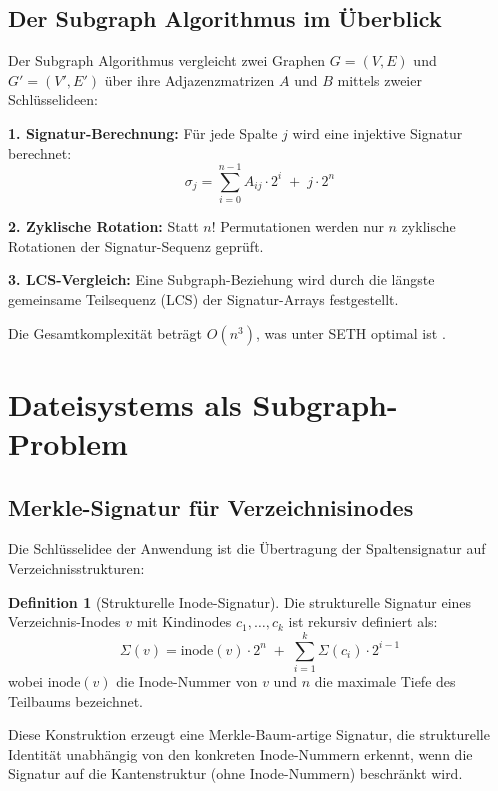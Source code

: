 ﻿\documentclass[a4paper,12pt]{article}
\theoremstyle{definition}
\newtheorem{definition}{Definition}
\begin{document}
\subsection{Der Subgraph Algorithmus im \"Uberblick}

Der Subgraph Algorithmus \cite{epp2026subgraph} vergleicht zwei Graphen
$G = (V, E)$ und $G' = (V', E')$ \"uber ihre Adjazenzmatrizen $A$ und $B$
mittels zweier Schl\"usselideen:

\textbf{1. Signatur-Berechnung:} F\"ur jede Spalte $j$ wird eine injektive
Signatur berechnet:
\[
    \sigma_j = \sum_{i=0}^{n-1} A_{ij} \cdot 2^i \;+\; j \cdot 2^n
\]

\textbf{2. Zyklische Rotation:} Statt $n!$ Permutationen werden nur $n$
zyklische Rotationen der Signatur-Sequenz gepr\"uft.

\textbf{3. LCS-Vergleich:} Eine Subgraph-Beziehung wird durch die l\"angste
gemeinsame Teilsequenz (LCS) der Signatur-Arrays festgestellt.

Die Gesamtkomplexit\"at betr\"agt $O(n^3)$, was unter SETH optimal ist
\cite{epp2026subgraph}.

\section{Dateisystems als Subgraph-Problem}

\subsection{Merkle-Signatur f\"ur Verzeichnisinodes}

Die Schlüsselidee der Anwendung ist die \"Ubertragung der Spaltensignatur auf
Verzeichnisstrukturen:

\begin{definition}[Strukturelle Inode-Signatur]
    Die strukturelle Signatur eines Verzeichnis-Inodes $v$ mit
    Kindinodes $c_1, \ldots, c_k$ ist rekursiv definiert als:
    \[
        \Sigma(v) = \text{inode}(v) \cdot 2^n \;+\;
        \sum_{i=1}^{k} \Sigma(c_i) \cdot 2^{i-1}
    \]
    wobei $\text{inode}(v)$ die Inode-Nummer von $v$ und $n$ die maximale
    Tiefe des Teilbaums bezeichnet.
\end{definition}

Diese Konstruktion erzeugt eine Merkle-Baum-artige Signatur, die strukturelle
Identit\"at unabh\"angig von den konkreten Inode-Nummern erkennt, wenn die
Signatur auf die Kantenstruktur (ohne Inode-Nummern) beschr\"ankt wird.
\end{document}
